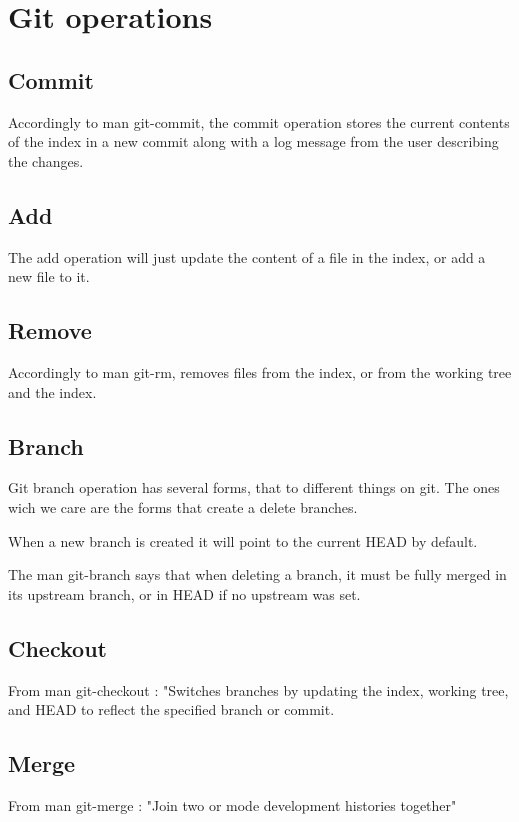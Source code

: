 \section{Git operations}

\subsection{Commit}

Accordingly to man git-commit, the commit operation 
stores the current contents of the index in a new commit 
along with a log message from the user describing the changes. \par 

\subsection{Add}

The add operation will just update the content of a file in the index, 
or add a new file to it. \par

\subsection{Remove}

Accordingly to man git-rm, removes files from the index, or from the
working tree and the index. \par

\subsection{Branch}

Git branch operation has several forms, that to different things on git.
The ones wich we care are the forms that create a delete branches. \par
When a new branch is created it will point to the current HEAD by default.
\par
The man git-branch says that when deleting a branch, it must be fully
merged in its upstream branch, or in HEAD if no upstream was set. \par

\subsection{Checkout}

From man git-checkout : "Switches branches by updating the index, 
working tree, and HEAD to reflect the specified branch or commit. \par

\subsection{Merge}

From man git-merge : "Join two or mode development histories together" \par


